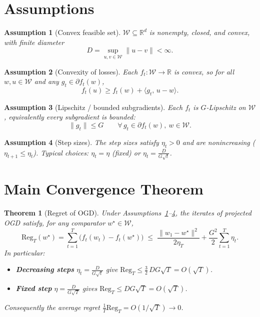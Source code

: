 \documentclass[11pt]{article}
\newtheorem{theorem}{Theorem}
\newtheorem{assumption}{Assumption}
\begin{document}
\section*{Assumptions}

\begin{assumption}[Convex feasible set]\label{a:set}
$\mathcal{W} \subseteq \mathbb{R}^d$ is nonempty, closed, and convex, with finite diameter
\[
D = \sup_{u,v\in\mathcal{W}} \|u-v\| < \infty.
\]
\end{assumption}

\begin{assumption}[Convexity of losses]\label{a:convex}
Each $f_t:\mathcal{W}\to\mathbb{R}$ is convex, so for all $w,u\in\mathcal{W}$ and any
$g_t\in\partial f_t(w)$,
\[
f_t(u) \ge f_t(w) + \langle g_t,\, u - w \rangle.
\]
\end{assumption}

\begin{assumption}[Lipschitz / bounded subgradients]\label{a:lip}
Each $f_t$ is $G$-Lipschitz on $\mathcal{W}$, equivalently every subgradient is bounded:
\[
\|g_t\| \le G \qquad \forall\, g_t\in\partial f_t(w),\ w\in\mathcal{W}.
\]
\end{assumption}

\begin{assumption}[Step sizes]\label{a:step}
The step sizes satisfy $\eta_t>0$ and are nonincreasing ($\eta_{t+1}\le\eta_t$).
Typical choices: $\eta_t = \eta$ (fixed) or $\eta_t = \frac{D}{G\sqrt{t}}$.
\end{assumption}

\section*{Main Convergence Theorem}

\begin{theorem}[Regret of OGD]\label{thm:main}
Under Assumptions~\ref{a:set}--\ref{a:step}, the iterates of projected OGD satisfy,
for any comparator $w^\star\in\mathcal{W}$,
\[
\mathrm{Reg}_T(w^\star)
= \sum_{t=1}^{T}\bigl(f_t(w_t) - f_t(w^\star)\bigr)
\;\le\;
\frac{\|w_1 - w^\star\|^2}{2\eta_T}
+ \frac{G^2}{2}\sum_{t=1}^{T}\eta_t.
\]
In particular:
\begin{itemize}
  \item \textbf{Decreasing steps} $\eta_t = \frac{D}{G\sqrt{t}}$ give
        $\mathrm{Reg}_T \le \tfrac{3}{2}\,D G \sqrt{T} = O(\sqrt{T})$.
  \item \textbf{Fixed step} $\eta = \frac{D}{G\sqrt{T}}$ gives
        $\mathrm{Reg}_T \le D G \sqrt{T} = O(\sqrt{T})$.
\end{itemize}
Consequently the average regret $\frac{1}{T}\mathrm{Reg}_T = O(1/\sqrt{T}) \to 0$.
\end{theorem}
\end{document}
